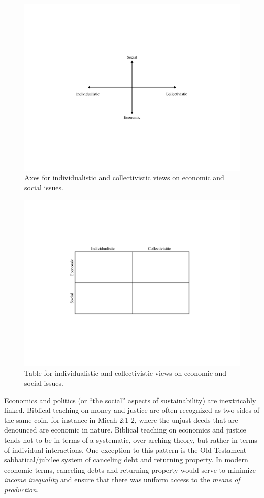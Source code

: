 \documentclass[12pt]{article}
\begin{document}
\begin{figure}
\centering
\includegraphics[width=0.65\linewidth]{figure_other/QuadAxes}
\caption{Axes for individualistic and collectivistic views on economic and social issues.}
\label{fig:axes}
\end{figure}

\begin{figure}
\centering
\includegraphics[width=0.75\linewidth]{figure_other/QuadTable}
\caption{Table for individualistic and collectivistic views on economic and social issues.}
\label{fig:table}
\end{figure}


Economics and politics (or ``the social'' aspects of sustainability) are inextricably linked. Biblical teaching on money
and justice are often recognized as two sides of the same coin, for instance in Micah 2:1-2, where the unjust deeds that
are denounced are economic in nature. Biblical teaching on economics and justice tends not to be in terms of a
systematic, over-arching theory, but rather in terms of individual interactions.
One exception to this pattern is the Old Testament sabbatical/jubilee system of canceling debt and returning property. 
In modern economic terms, canceling debts and returning property would serve to minimize 
\emph{income inequality} and ensure that there was uniform access to the \emph{means of production}.
\end{document}
